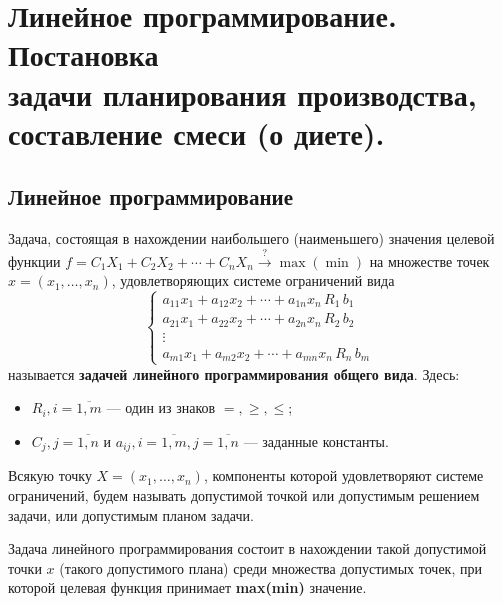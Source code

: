 \documentclass[17pt]{extarticle}
\begin{document}
\section{Линейное программирование. Постановка \\ задачи планирования производства, составление смеси (о диете).}
\subsection{Линейное программирование}

\begin{definition}
    Задача, состоящая в нахождении наибольшего (наименьшего) значения целевой функции
    \(
    f = C_1 X_1 + C_2 X_2 + \cdots + C_n X_n \xrightarrow{?} \max(\min)
    \)
    на множестве точек \( x = (x_1, \ldots, x_n) \), удовлетворяющих системе ограничений вида
    \[
        \begin{cases}
            a_{11}x_1 + a_{12}x_2 + \cdots + a_{1n}x_n \, R_1 \, b_1 \\
            a_{21}x_1 + a_{22}x_2 + \cdots + a_{2n}x_n \, R_2 \, b_2 \\
            \vdots                                                   \\
            a_{m1}x_1 + a_{m2}x_2 + \cdots + a_{mn}x_n \, R_n \, b_m
        \end{cases}
    \]
    называется \textbf{задачей линейного программирования общего вида}.
    Здесь:
    \begin{itemize}
        \item \( R_i, i = \overline{1, m} \) — один из знаков \( =, \geq, \leq \);
        \item \( C_j, j = \overline{1, n} \) и \( a_{ij}, i = \overline{1, m}, j = \overline{1, n} \) — заданные константы.
    \end{itemize}
\end{definition}

\begin{definition}
    Всякую точку \( X = (x_1, \ldots, x_n) \), компоненты которой удовлетворяют системе ограничений,
    будем называть допустимой точкой или допустимым решением задачи, или допустимым планом задачи.
\end{definition}

Задача линейного программирования состоит в нахождении такой допустимой точки \( x \) (такого допустимого плана) среди множества допустимых точек,
при которой целевая функция принимает \textbf{max(min)} значение.
\end{document}
